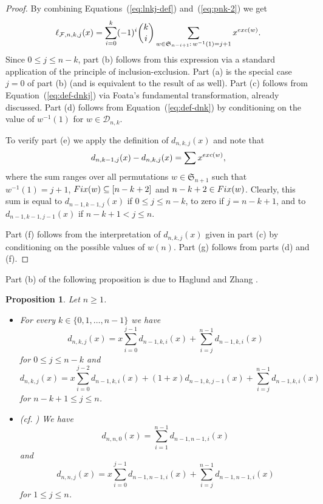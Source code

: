 \documentclass[11pt]{amsart}
\newtheorem{proposition}[theorem]{Proposition}
\newcommand{\exc}{{\rm exc}}
\newcommand{\Fix}{{\rm Fix}}
\newcommand{\dD}{{\mathcal D}}
\newcommand{\fF}{{\mathcal F}}
\newcommand{\fS}{{\mathfrak S}}
\begin{document}
\begin{proof}
By combining Equations~(\ref{eq:lnkj-def}) 
and~(\ref{eq:pnk-2}) we get 
%
\[ \ell_{\fF,n,k,j}(x) = 
   \sum_{i=0}^k (-1)^i {k \choose i}
   \sum_{w \in \fS_{n-i+1}: \, w^{-1}(1) = 
		  			           j+1} x^{\exc(w)}. \]
%
Since $0 \le j \le n-k$, part (b) follows from this 
expression via a standard application of the 
principle of inclusion-exclusion. Part (a) is the 
special case $j=0$ of part (b) (and is equivalent 
to the result of \cite[Example~6.3~(a)]{Ath23+} as
well). Part (c) follows from 
Equation~(\ref{eq:def-dnkj}) via Foata's
fundamental transformation, already discussed.
Part (d) follows from Equation~(\ref{eq:def-dnk})
by conditioning on the value of $w^{-1}(1)$ for $w 
\in \dD_{n,k}$. 

To verify part (e) we apply the definition of 
$d_{n,k,j}(x)$ and note that
%
\[ d_{n,k-1,j}(x) - d_{n,k,j}(x) = \sum
   x^{\exc(w)}, \]
% 
where the sum ranges over all permutations $w \in 
\fS_{n+1}$ such that $w^{-1}(1) = j+1$, $\Fix(w) 
\subseteq [n-k+2]$ and $n-k+2 \in \Fix(w)$.
Clearly, this sum is equal to $d_{n-1,k-1,j}(x)$
if $0 \le j \le n-k$, to zero if $j = n-k+1$, and 
to $d_{n-1,k-1,j-1}(x)$ if $n-k+1 < j \le n$.

Part (f) follows from the interpretation of 
$d_{n,k,j}(x)$ given in part (c) by conditioning 
on the possible values of $w(n)$. Part (g) follows
from parts (d) and (f).
\end{proof}

Part (b) of the following proposition is due to
Haglund and Zhang \cite[p.~46]{HZ19}.
%
\begin{proposition} \label{prop:dnkj-rec} 
Let $n \ge 1$.
%
\begin{itemize}
\itemsep=0pt
\item[(a)]  
For every $k \in \{0, 1,\dots,n-1\}$ we have
%
\[ d_{n,k,j}(x) = x \sum_{i=0}^{j-1} d_{n-1,k,i}(x) 
                  + \sum_{i=j}^{n-1} d_{n-1,k,i}(x) 
									  \]
%
for $0 \le j \le n-k$ and 
%
\[ d_{n,k,j}(x) = x \sum_{i=0}^{j-2} d_{n-1,k,i}(x) 
                  + (1+x) d_{n-1,k,j-1}(x) + 
									  \sum_{i=j}^{n-1} d_{n-1,k,i}(x) 
									  \]
%
for $n-k+1 \le j \le n$.

\item[(b)] {\rm (cf. \cite[p.~46]{HZ19})}
We have 
%
\[ d_{n,n,0}(x) = \sum_{i=1}^{n-1} d_{n-1,n-1,i}(x) 
   \]
%
and 
%
\[ d_{n,n,j}(x) = x \sum_{i=0}^{j-1} d_{n-1,n-1,i}(x) 
                  + \sum_{i=j}^{n-1} d_{n-1,n-1,i}(x)
									\]
%
for $1 \le j \le n$.
\end{itemize}
\end{proposition}
\end{document}
